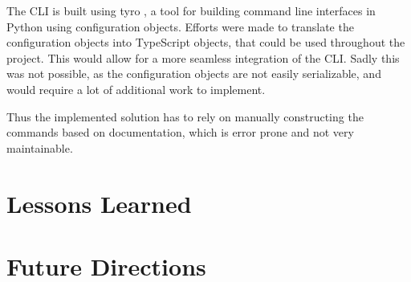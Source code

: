 The CLI is built using tyro \cite{yi_brentyityro_2024}, a tool for building command line interfaces in Python using configuration objects.
Efforts were made to translate the configuration objects into TypeScript objects, that could be used throughout the project.
This would allow for a more seamless integration of the CLI.
Sadly this was not possible, as the configuration objects are not easily serializable, and would require a lot of additional work to implement.

Thus the implemented solution has to rely on manually constructing the commands based on documentation, which is error prone and not very maintainable.


\section{Lessons Learned}
\label{sec:system:lessons}

\section{Future Directions}
\label{sec:system:future}
